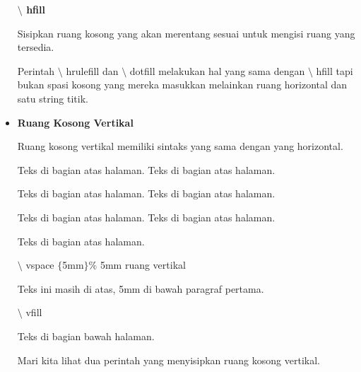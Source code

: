 \begin{itemize}
\hspace*{0.5in}\textbf{$\setminus$ hfill}\par

\hspace*{0.5in}Sisipkan ruang kosong yang akan merentang sesuai untuk mengisi ruang yang tersedia.\par

Perintah $\setminus$ hrulefill dan $\setminus$ dotfill melakukan hal yang sama dengan $\setminus$ hfill tapi bukan spasi kosong yang mereka masukkan melainkan ruang horizontal dan satu string titik.\par

\vspace{10pt}
	\item {\fontsize{14pt}{14pt}\selectfont \textbf{Ruang Kosong Vertikal}}\par

Ruang kosong vertikal memiliki sintaks yang sama dengan yang horizontal.\par


\hspace*{0.5in}Teks di bagian atas halaman. Teks di bagian atas halaman.\par

\hspace*{0.5in}Teks di bagian atas halaman. Teks di bagian atas halaman.\par

\hspace*{0.5in}Teks di bagian atas halaman. Teks di bagian atas halaman.\par

\hspace*{0.5in}Teks di bagian atas halaman.\par

\hspace*{0.5in}$\setminus$ vspace $ \{ $5mm$ \} $$\%$ 5mm ruang vertikal\par

\hspace*{0.5in}Teks ini masih di atas, 5mm di bawah paragraf pertama.\par

\hspace*{0.5in}$\setminus$ vfill\par

\hspace*{0.5in}Teks di bagian bawah halaman.\par

Mari kita lihat dua perintah yang menyisipkan ruang kosong vertikal.\par


\end{itemize}
